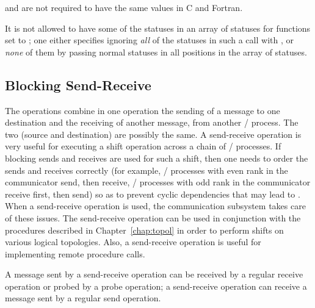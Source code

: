 and  are not
required to have the same values in C and Fortran.

It is not allowed to have some of the statuses in an array of statuses for
functions set to
; one either specifies ignoring \emph{all} of
the statuses in such a call with , or \emph{none}
of them by passing normal statuses in all positions in the array
of statuses.

\subsection{Blocking Send-Receive}
\label{sec:pt2pt-sendrecv}

The  operations combine in one operation the sending of a
message to one destination and the receiving of another message, from
another \MPI/ process.  The two (source and destination) are possibly the same.
A send-receive operation is
very useful for executing a shift operation across a chain of
\MPI/ processes.  If blocking sends and receives are used for such a shift,
then one needs to order the sends and receives correctly (for
example, \MPI/ processes with even rank in the communicator
send, then receive, \MPI/ processes with odd rank in the communicator receive first, then send) so as to prevent
cyclic dependencies that may lead to .  When a send-receive
operation is used, the communication subsystem takes care of
these issues.  The send-receive operation can be used in conjunction
with the procedures described in Chapter~\ref{chap:topol} in order to
perform shifts on various logical topologies.
Also, a send-receive operation is useful for implementing
remote procedure calls.


A message sent by a
send-receive operation can be received by a regular receive
operation or probed by a probe operation; a send-receive operation can
receive a message sent by a regular send operation.


